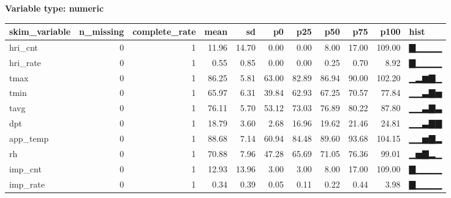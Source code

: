 \documentclass[
]{article}
\newenvironment{Shaded}{\begin{snugshade}}{\end{snugshade}}
\newcommand{\CommentTok}[1]{\textcolor[rgb]{0.56,0.35,0.01}{\textit{#1}}}
\newcommand{\DecValTok}[1]{\textcolor[rgb]{0.00,0.00,0.81}{#1}}
\newcommand{\FunctionTok}[1]{\textcolor[rgb]{0.00,0.00,0.00}{#1}}
\newcommand{\NormalTok}[1]{#1}
\newcommand{\OtherTok}[1]{\textcolor[rgb]{0.56,0.35,0.01}{#1}}
\newcommand{\SpecialCharTok}[1]{\textcolor[rgb]{0.00,0.00,0.00}{#1}}
\begin{document}
\textbf{Variable type: numeric}

\begin{longtable}[]{@{}lrrrrrrrrrl@{}}
\toprule
skim\_variable & n\_missing & complete\_rate & mean & sd & p0 & p25 &
p50 & p75 & p100 & hist \\
\midrule
\endhead
hri\_cnt & 0 & 1 & 11.96 & 14.70 & 0.00 & 0.00 & 8.00 & 17.00 & 109.00 &
▇▁▁▁▁ \\
hri\_rate & 0 & 1 & 0.55 & 0.85 & 0.00 & 0.00 & 0.25 & 0.70 & 8.92 &
▇▁▁▁▁ \\
tmax & 0 & 1 & 86.25 & 5.81 & 63.00 & 82.89 & 86.94 & 90.00 & 102.20 &
▁▂▆▇▁ \\
tmin & 0 & 1 & 65.97 & 6.31 & 39.84 & 62.93 & 67.25 & 70.57 & 77.84 &
▁▁▃▇▅ \\
tavg & 0 & 1 & 76.11 & 5.70 & 53.12 & 73.03 & 76.89 & 80.22 & 87.80 &
▁▁▃▇▃ \\
dpt & 0 & 1 & 18.79 & 3.60 & 2.68 & 16.96 & 19.62 & 21.46 & 24.81 &
▁▁▃▇▇ \\
app\_temp & 0 & 1 & 88.68 & 7.14 & 60.94 & 84.48 & 89.60 & 93.68 &
104.15 & ▁▁▅▇▂ \\
rh & 0 & 1 & 70.88 & 7.96 & 47.28 & 65.69 & 71.05 & 76.36 & 99.01 &
▁▅▇▂▁ \\
imp\_cnt & 0 & 1 & 12.93 & 13.96 & 3.00 & 3.00 & 8.00 & 17.00 & 109.00 &
▇▁▁▁▁ \\
imp\_rate & 0 & 1 & 0.34 & 0.39 & 0.05 & 0.11 & 0.22 & 0.44 & 3.98 &
▇▁▁▁▁ \\
\bottomrule
\end{longtable}

\begin{Shaded}
\end{Shaded}
\end{document}
